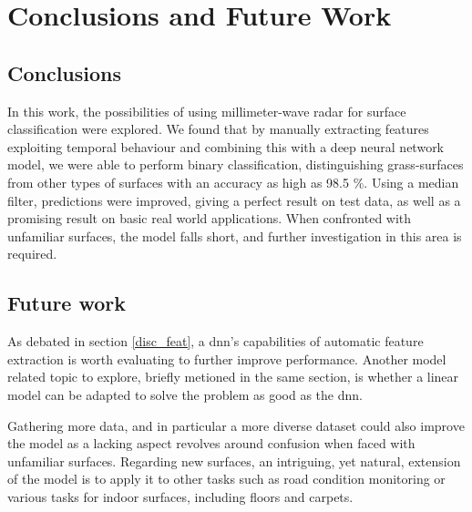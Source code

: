 \chapter{Conclusions and Future Work}

\section{Conclusions}
In this work, the possibilities of using millimeter-wave radar for surface classification were explored. We found that by manually extracting features exploiting temporal behaviour and combining this with a deep neural network model, we were able to perform binary classification, distinguishing grass-surfaces from other types of surfaces with an accuracy as high as 98.5 \%. Using a median filter, predictions were improved, giving a perfect result on test data, as well as a promising result on basic real world applications. When confronted with unfamiliar surfaces, the model falls short, and further investigation in this area is required. 


\section{Future work}
As debated in section \ref{disc_feat}, a \gls{dnn}'s capabilities of automatic feature extraction is worth evaluating to further improve performance. Another model related topic to explore, briefly metioned in the same section, is whether a linear model can be adapted to solve the problem as good as the \gls{dnn}.

Gathering more data, and in particular a more diverse dataset could also improve the model as a lacking aspect revolves around confusion when faced with unfamiliar surfaces. Regarding new surfaces, an intriguing, yet natural, extension of the model is to apply it to other tasks such as road condition monitoring or various tasks for indoor surfaces, including floors and carpets.


